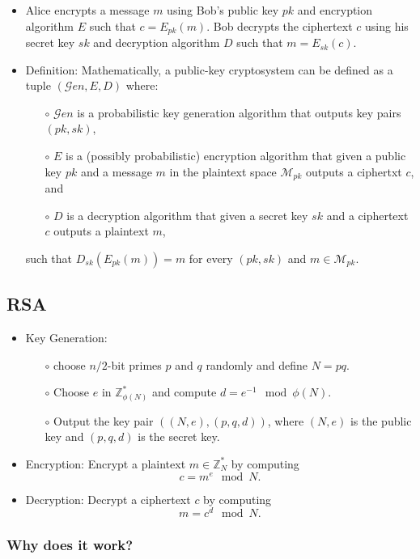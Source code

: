 \documentclass[a4paper]{scrartcl}
\begin{document}
\begin{itemize}
\item Alice encrypts a message $m$ using Bob's public key $pk$ and encryption algorithm $E$ such that $c = E_{pk}(m)$. Bob decrypts the ciphertext $c$ using his secret key $sk$ and decryption algorithm  $D$ such that $m = E_{sk}(c)$.
\item Definition: Mathematically, a public-key cryptosystem can be defined as a tuple $({\mathcal Gen}, E, D)$ where:

\begin{itemize}
\item [$\circ$] ${\mathcal Gen}$ is a probabilistic key generation algorithm that outputs key pairs $(pk,sk)$,
\item [$\circ$] $E$ is a (possibly probabilistic) encryption algorithm that given a public key $pk$ and a message $m$ in the plaintext space ${\mathcal M}_{pk}$ outputs a ciphertxt $c$, and
\item [$\circ$] $D$ is a decryption algorithm that given a secret key $sk$ and a ciphertext $c$ outputs a plaintext $m$, 
\end{itemize}
such that $D_{sk}(E_{pk}(m)) = m$ for every $(pk,sk)$ and $m \in \mathcal {M}_{pk}$.
\end{itemize}

\subsection*{RSA}

\begin{itemize}
\item Key Generation:
\begin{itemize}
\item [$\circ$] choose $n/2$-bit primes $p$ and $q$ randomly and define $N = pq$.
\item [$\circ$] Choose $e$ in $\mathbb{Z}_{\phi(N)}^*$ and compute $d = e^{-1}\mod \phi(N)$.
\item [$\circ$] Output the key pair $((N,e), (p,q,d))$, where $(N,e)$ is the public key and $(p,q,d)$ is the secret key.
\end{itemize}
\item Encryption: Encrypt a plaintext $m \in \mathbb{Z}_N^*$ by computing $$c = m^e \mod N.$$
\item Decryption: Decrypt a ciphertext $c$ by computing $$m = c^d \mod N.$$
\end{itemize}

\subsubsection*{Why does it work?}
\end{document}
